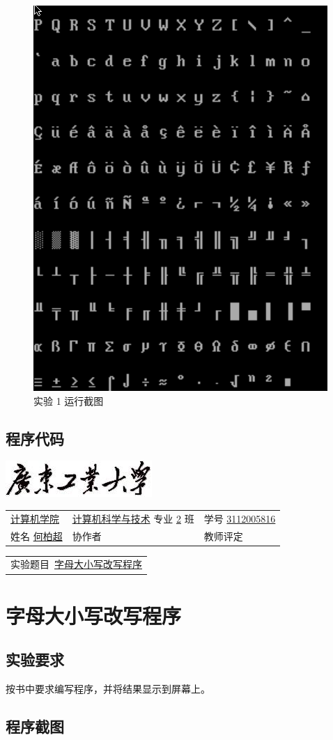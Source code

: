 \documentclass[a4paper,12pt]{article}
\newcommand{\labtitle}[1] {
    \centerline{\includegraphics[scale=0.5]{resource/chapter-caption}}

    \begin{tabular}{ l l l }
        \\  %
        \underline{\hspace{3pt} 计算机学院 \hspace{3pt}} &
            \underline{计算机科学与技术} 专业 \underline{2} 班 &
            学号 \underline{3112005816} \\[3pt]

        姓名 \underline{\hspace{3pt} 何柏超 \hspace{3pt}} &
            协作者 \underline{\hspace{50pt}} &
            教师评定 \underline{\hspace{35pt}} \\[3pt]
    \end{tabular}

    \begin{tabular}{l}
    实验题目\ \underline{#1} \\[3pt]
    \end{tabular}
    \section{#1}
}
\begin{document}
\begin{figure}[h!]
    \caption{实验 1 运行截图}
    \centering
        \includegraphics[scale=0.5]{src/2}
\end{figure}

\subsection{程序代码}



\clearpage


\labtitle{字母大小写改写程序}

\subsection{实验要求}

按书中要求编写程序，并将结果显示到屏幕上。

\subsection{程序截图}
\end{document}
